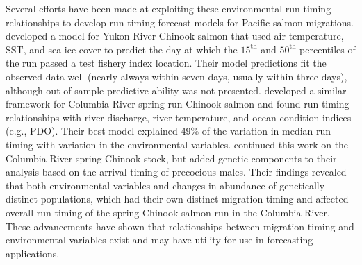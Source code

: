 \documentclass[12pt,]{book}
\theoremstyle{definition}
\theoremstyle{definition}
\theoremstyle{definition}
\theoremstyle{remark}
\begin{document}
Several efforts have been made at exploiting these environmental-run
timing relationships to develop run timing forecast models for Pacific
salmon migrations. \citet{mundy-evenson-2011} developed a model for
Yukon River Chinook salmon that used air temperature, SST, and sea ice
cover to predict the day at which the \(15^{\text{th}}\) and
\(50^{\text{th}}\) percentiles of the run passed a test fishery index
location. Their model predictions fit the observed data well (nearly
always within seven days, usually within three days), although
out-of-sample predictive ability was not presented.
\citet{keefer-etal-2008} developed a similar framework for Columbia
River spring run Chinook salmon and found run timing relationships with
river discharge, river temperature, and ocean condition indices (e.g.,
PDO). Their best model explained 49\% of the variation in median run
timing with variation in the environmental variables.
\citet{anderson-beer-2009} continued this work on the Columbia River
spring Chinook stock, but added genetic components to their analysis
based on the arrival timing of precocious males. Their findings revealed
that both environmental variables and changes in abundance of
genetically distinct populations, which had their own distinct migration
timing and affected overall run timing of the spring Chinook salmon run
in the Columbia River. These advancements have shown that relationships
between migration timing and environmental variables exist and may have
utility for use in forecasting applications.
\end{document}

